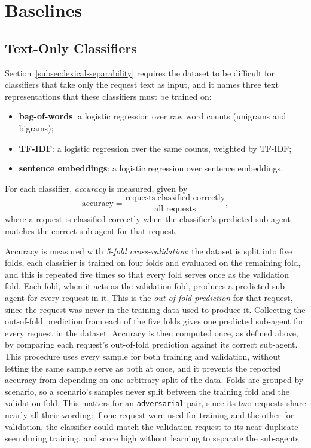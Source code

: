 \section{Baselines}
\label{sec:dataset-baselines}

\subsection{Text-Only Classifiers}
\label{subsec:text-only-baselines}

Section~\ref{subsec:lexical-separability} requires the dataset to be difficult for classifiers that take only the request text as input, and it names three text representations that these classifiers must be trained on:

\begin{itemize}
    \item \textbf{bag-of-words}: a logistic regression over raw word counts (unigrams and bigrams);
    \item \textbf{TF-IDF}: a logistic regression over the same counts, weighted by TF-IDF;
    \item \textbf{sentence embeddings}: a logistic regression over sentence embeddings.
\end{itemize}

For each classifier, \emph{accuracy} is measured, given by
\begin{equation}
    \text{accuracy} = \frac{\text{requests classified correctly}}{\text{all requests}},
\end{equation}
where a request is classified correctly when the classifier's predicted sub-agent matches the correct sub-agent for that request.

Accuracy is measured with \emph{5-fold cross-validation}: the dataset is split into five folds, each classifier is trained on four folds and evaluated on the remaining fold, and this is repeated five times so that every fold serves once as the validation fold. Each fold, when it acts as the validation fold, produces a predicted sub-agent for every request in it. This is the \emph{out-of-fold prediction} for that request, since the request was never in the training data used to produce it. Collecting the out-of-fold prediction from each of the five folds gives one predicted sub-agent for every request in the dataset. Accuracy is then computed once, as defined above, by comparing each request's out-of-fold prediction against its correct sub-agent. This procedure uses every sample for both training and validation, without letting the same sample serve as both at once, and it prevents the reported accuracy from depending on one arbitrary split of the data. Folds are grouped by scenario, so a scenario's samples never split between the training fold and the validation fold. This matters for an \texttt{adversarial} pair, since its two requests share nearly all their wording: if one request were used for training and the other for validation, the classifier could match the validation request to its near-duplicate seen during training, and score high without learning to separate the sub-agents.

